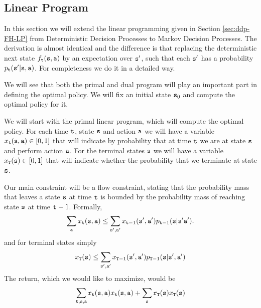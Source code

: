 \begin{leftbar}
\section{Linear Program}
\label{C-MDP-FH:sec:LP}




In this section we will extend the linear programming given in
Section \ref{sec:ddp-FH-LP} from Deterministic Decision Processes to
Markov Decision Processes. The derivation is almost identical and
the difference is that replacing the deterministic next state
$f_{\tt t}({\tt s},{\tt a})$ by an expectation over ${\tt s}'$, such
that each ${\tt s}'$ has a probability
$p_{\tt t}({\tt s}'|{\tt s},{\tt a})$. For completeness we do it in a
detailed way.



%
We will see that both the primal and dual program will play
an important part in defining the optimal policy. We will fix an
initial state ${\tt s}_0$ and compute the optimal policy for it.

We will start with the primal linear program, which will compute the
optimal policy. For each time ${\tt t}$, state ${\tt s}$ and action
${\tt a}$ we will have a variable
$x_{{\tt t}}({\tt s},{\tt a})\in[0,1]$ that will indicate by
probability that at time ${\tt t}$ we are at state ${\tt s}$ and
perform action ${\tt a}$. For the terminal states ${\tt s}$ we will
have a variable $x_{{\tt T}}({\tt s})\in[0,1]$ that will indicate
whether the probability that we terminate at state ${\tt s}$.

Our main constraint will be a flow constraint, stating that the
probability mass that leaves a state ${\tt s}$ at time ${\tt t}$ is
bounded by the probability mass of reaching state ${\tt s}$ at time
${\tt t}-1$.
%
Formally,
\[
\sum_{{\tt a}} x_{{\tt t}}({\tt s},{\tt a})\leq
\sum_{{\tt s}',{\tt a}'}
x_{{\tt t}-1}({\tt s}',{\tt a}')p_{{\tt t}-1}({\tt s}|{\tt s}'{\tt a}').
\]
and for terminal states simply
\[
x_{{\tt T}}({\tt s})\leq\sum_{{\tt s}',{\tt a}'}
x_{{\tt T}-1}({\tt s}',{\tt a}')p_{{\tt T}-1}({\tt s}|{\tt s}',{\tt a}')
\]
The return, which we would like to maximize, would be
\[
\sum_{{\tt t},{\tt s},{\tt a}}
{\tt r}_{{\tt t}}({\tt s},{\tt a})x_{{\tt t}}({\tt s},{\tt a})+\sum_{{\tt s}}{\tt r}_{{\tt T}}({\tt s})x_{{\tt T}}({\tt s})
\]


\end{leftbar}
